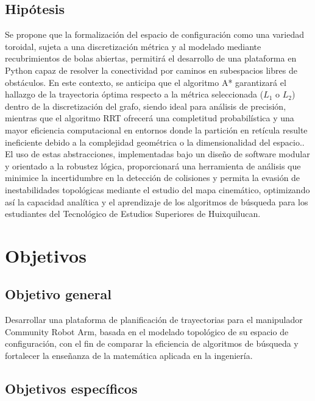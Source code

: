 \subsection{Hipótesis} 

Se propone que la formalización del espacio de configuración como una variedad toroidal, sujeta a una discretización métrica 
y al modelado mediante recubrimientos de bolas abiertas, permitirá el desarrollo de una 
plataforma en Python capaz de resolver la conectividad por caminos en subespacios libres de obstáculos. 
En este contexto, se anticipa que el algoritmo A* garantizará el hallazgo de la trayectoria óptima respecto a la métrica 
seleccionada ($L_1$ o $L_2$) dentro de la discretización del grafo, siendo ideal para análisis de precisión, 
mientras que el algoritmo RRT ofrecerá una completitud 
probabilística y una mayor eficiencia computacional en entornos donde la partición en retícula 
resulte ineficiente debido a la complejidad geométrica o la dimensionalidad del espacio.. 
El uso de estas abstracciones, implementadas bajo un diseño de software modular y orientado a la robustez lógica, proporcionará una herramienta 
de análisis que minimice la incertidumbre en la detección de colisiones y permita la evasión de inestabilidades 
topológicas mediante el estudio del mapa cinemático, optimizando así la capacidad analítica y 
el aprendizaje de los algoritmos de búsqueda para los estudiantes del Tecnológico de Estudios Superiores de Huixquilucan.

\section{Objetivos} 
\subsection{Objetivo general}

Desarrollar una plataforma de planificación de trayectorias para el manipulador 
Community Robot Arm, basada en el modelado topológico de su espacio de configuración, 
con el fin de comparar la eficiencia de algoritmos de búsqueda y fortalecer la enseñanza de 
la matemática aplicada en la ingeniería.

\subsection{Objetivos específicos}

